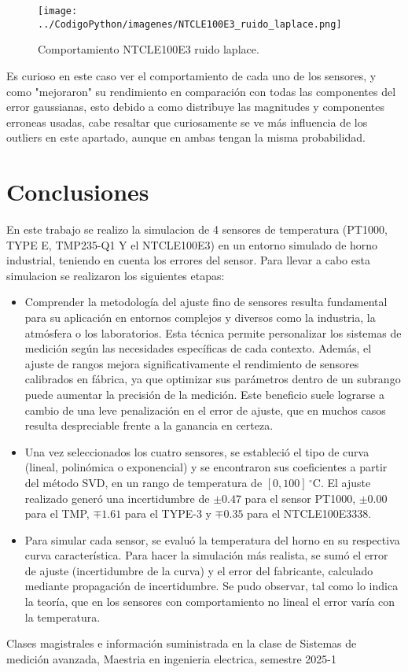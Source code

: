 \documentclass[conference]{IEEEtran}
\begin{document}
\begin{figure}[h!]
	\centering
	\texttt{[image: ../CodigoPython/imagenes/NTCLE100E3\_ruido\_laplace.png]}
	\caption{Comportamiento NTCLE100E3 ruido laplace.}
	\label{fig:NTCLE100E3_ruido_laplace}
\end{figure}

Es curioso en este caso ver el comportamiento de cada uno de los sensores, y como "mejoraron" su rendimiento en comparación con todas las componentes del error gaussianas, esto debido a como distribuye las magnitudes y componentes erroneas usadas, cabe resaltar que curiosamente se ve más influencia de los outliers en este apartado, aunque en ambas tengan la misma probabilidad.

\section{Conclusiones}

En este trabajo se realizo la simulacion de 4 sensores de temperatura (PT1000, TYPE E, TMP235-Q1 Y el NTCLE100E3) en un entorno simulado de horno industrial, teniendo en cuenta los errores del sensor. Para llevar a cabo esta simulacion se realizaron los siguientes etapas:

\begin{itemize}
	\item Comprender la metodología del ajuste fino de sensores resulta fundamental para su aplicación en entornos complejos y diversos como la industria, la atmósfera o los laboratorios. Esta técnica permite personalizar los sistemas de medición según las necesidades específicas de cada contexto. Además, el ajuste de rangos mejora significativamente el rendimiento de sensores calibrados en fábrica, ya que optimizar sus parámetros dentro de un subrango puede aumentar la precisión de la medición. Este beneficio suele lograrse a cambio de una leve penalización en el error de ajuste, que en muchos casos resulta despreciable frente a la ganancia en certeza.
	
	\item Una vez seleccionados los cuatro sensores, se estableció el tipo de curva (lineal, polinómica o exponencial) y se encontraron sus coeficientes a partir del método SVD, en un rango de temperatura de $[0, 100]\,^\circ\mathrm{C}$. El ajuste realizado generó una incertidumbre de $\pm 0.47$ para el sensor PT1000, $\pm 0.00$ para el TMP, $\mp 1.61$ para el TYPE-3 y $\mp 0.35$ para el NTCLE100E3338.
	
	\item Para simular cada sensor, se evaluó la temperatura del horno en su respectiva curva característica. Para hacer la simulación más realista, se sumó el error de ajuste (incertidumbre de la curva) y el error del fabricante, calculado mediante propagación de incertidumbre. Se pudo observar, tal como lo indica la teoría, que en los sensores con comportamiento no lineal el error varía con la temperatura.
	
	
\end{itemize}

\begin{thebibliography}{00}

\item Clases magistrales e información suministrada en la clase de Sistemas de medición avanzada, Maestria en ingenieria electrica, semestre 2025-1

\end{thebibliography}
\end{document}

